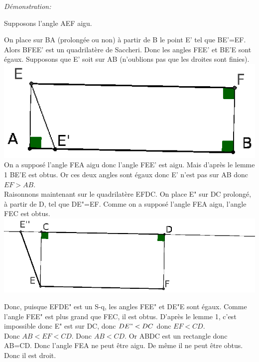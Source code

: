\documentclass[a4paper, 12pt, twoside]{book}
\begin{document}
\textit{Démonstration:}\

Supposons l'angle AEF aigu.\
 
 On place sur BA (prolongée ou non) à partir de B le point E' tel que BE'=EF. Alors BFEE' est un quadrilatère de Saccheri. Donc les angles FEE' et BE'E sont égaux. Supposons que E' soit sur AB (n'oublions pas que les droites sont finies).\\
 
  
 \includegraphics[scale=0.8]{figures/saccheri3.eps} \\
 
  On a supposé l'angle FEA aigu donc l'angle FEE' est aigu. Mais d'après le lemme 1 BE'E est obtus. Or ces deux angles sont égaux donc E' n'est pas sur AB donc $EF>AB$.\\
  
  

Raisonnons maintenant sur le quadrilatère EFDC. On place E" sur DC prolongé, à partir de D, tel que DE"=EF. Comme on a supposé l'angle FEA aigu, l'angle FEC est obtus.\\

\includegraphics[scale=0.8]{figures/saccheri2bis.eps}

 Donc, puisque EFDE" est un S-q, les angles FEE" et DE"E sont égaux. Comme l'angle FEE" est plus grand que FEC, il est obtus. D'après le lemme 1, c'est impossible donc E" est sur DC, donc $DE"<DC$ donc  $EF<CD$. \\

Donc $AB<EF<CD$. Donc $AB<CD$. Or ABDC est un rectangle donc AB=CD. Donc l'angle FEA ne peut être aigu. De même il ne peut être obtus. Donc il est droit.\\
 
\end{document}
